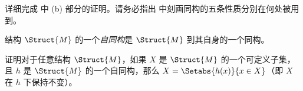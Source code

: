 \documentclass[../../../include/open-logic-section]{subfiles}
\begin{document}
\begin{prob}
详细完成  中 (b) 部分的证明。请务必指出  中刻画同构的五条性质分别在何处被用到。
\end{prob}

\begin{defn}
结构 $\Struct{M}$ 的一个\emph{自同构}是 $\Struct{M}$ 到其自身的一个同构。
\end{defn}

\begin{prob}
证明对于任意结构 $\Struct{M}$，如果 $X$ 是 $\Struct{M}$ 的一个可定义子集，且 $h$ 是 $\Struct{M}$ 的一个自同构，那么 $X
= \Setabs{h(x)}{x \in X}$（即 $X$ 在 $h$ 下保持不变）。
\end{prob}
\end{document}
